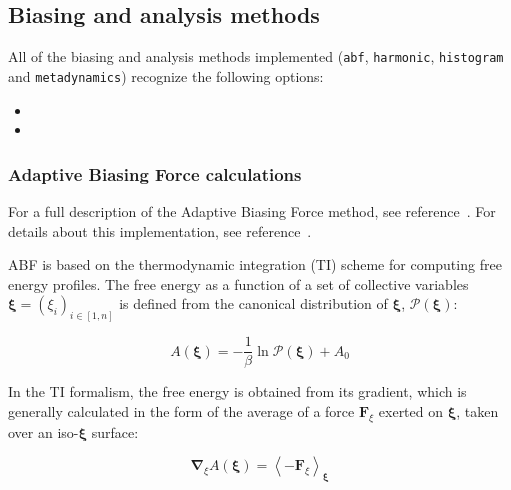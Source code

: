 \subsection{Biasing and analysis methods}
\label{sec:colvarbias}

All of the biasing and analysis methods implemented (\texttt{abf},
\texttt{harmonic}, \texttt{histogram} and \texttt{metadynamics})
recognize the following options:
\begin{itemize}

\item %

\item %

\end{itemize}


\subsubsection{Adaptive Biasing Force calculations}
\label{sec:colvarbias_abf}

For a full description of the Adaptive Biasing Force method, see
reference~\cite{Darve2008}. For details about this implementation,
see reference~\cite{Henin2004}.

ABF is based on the thermodynamic integration (TI) scheme for
computing free energy profiles. The free energy as a function
of a set of collective variables $\bm{\xi}=(\xi_{i})_{i\in[1,n]}$
is defined from the canonical distribution of $\bm{\xi}$, ${\mathcal P}(\bm{\xi})$:

\begin{equation}
  \label{eq:free}
  A(\bm{\xi}) = -\frac{1}{\beta} \ln {\mathcal P}(\bm{\xi}) + A_0
\end{equation}

In the TI formalism, the free energy is obtained from its gradient, 
which is generally calculated in the form of the average of a force
$\bm{F}_\xi$ exerted on $\bm{\xi}$, taken over an iso-$\bm{\xi}$ surface:

\begin{equation}
  \label{eq:gradient}
  \bm{\nabla}_\xi A(\bm{\xi}) = \left\langle -\bm{F}_\xi \right\rangle_\bm{\xi}
\end{equation}

